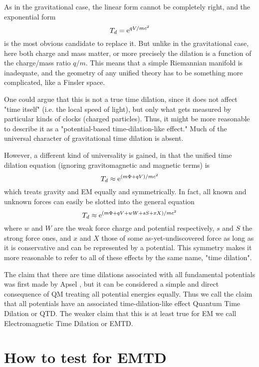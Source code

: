 As in the gravitational case,
the linear form cannot be completely right, and
the exponential form 
\begin{equation}
T_d = {\rm e}^{qV/mc^2}
\end{equation}
is the most obvious candidate to replace it.
But unlike in the gravitational case, here both charge and mass matter,
or more precisely the dilation is a function of the charge/mass ratio $q/m$.
This means that a simple Riemannian manifold is inadequate,
and the geometry of any unified theory has to be something more complicated,
like a Finsler space. \cite{Beil1987}

One could argue that this is not a true time dilation,
since it does not affect "time itself" (i.e. the local speed of light),
but only what gets measured by particular kinds of clocks (charged particles).
Thus, it might be more reasonable to describe it as a "potential-based time-dilation-like effect."
Much of the universal character of gravitational time dilation is absent.

However, a different kind of universality is gained,
in that the unified time dilation equation
(ignoring gravitomagnetic and magnetic terms) is
\begin{equation}\label{emtd}
T_d \approx  {\rm e}^{(m\Phi + qV) / mc^2}
\end{equation}
which treats gravity and EM equally and symmetrically.
In fact, all known and unknown forces can easily be slotted into the general equation
\begin{equation}\label{qtd}
T_d \approx  {\rm e}^{(m\Phi + qV + wW + sS + xX) / mc^2}
\end{equation}
where $w$ and $W$ are the weak force charge and potential respectively,
$s$ and $S$ the strong force ones,
and $x$ and $X$ those of some as-yet-undiscovered force
as long as it is conservative and can be represented by a potential.
This symmetry makes it more reasonable to refer to all of these effects by the same name,
"time dilation".

The claim that there are time dilations associated with all fundamental potentials
was first made by Apsel \cite{Apsel1978,Apsel1979},
but it can be considered a simple and direct consequence of QM treating all potential energies equally.
Thus we call the claim that all potentials have an associated time-dilation-like effect Quantum Time Dilation or QTD.
The weaker claim that this is at least true for EM we call Electromagnetic Time Dilation or EMTD.


\section{How to test for EMTD}
\label{sec:5}

